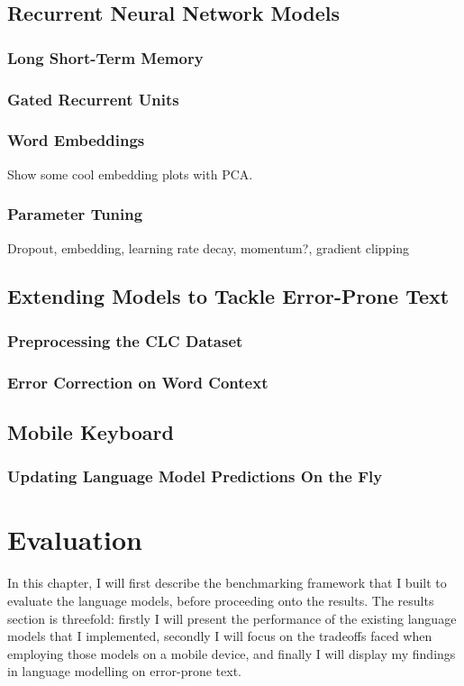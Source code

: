 \documentclass[a4paper, 12pt]{report}
\begin{document}
\section{Recurrent Neural Network Models}
\subsection{Long Short-Term Memory}
\subsection{Gated Recurrent Units}
\subsection{Word Embeddings}
Show some cool embedding plots with PCA.
\subsection{Parameter Tuning}
Dropout, embedding, learning rate decay, momentum?, gradient clipping
\section{Extending Models to Tackle Error-Prone Text}
\subsection{Preprocessing the CLC Dataset}
\subsection{Error Correction on Word Context}
\section{Mobile Keyboard}
\subsection{Updating Language Model Predictions On the Fly}

\chapter{Evaluation}

In this chapter, I will first describe the benchmarking framework that I built to evaluate the language models, before proceeding onto the results. The results section is threefold: firstly I will present the performance of the existing language models that I implemented, secondly I will focus on the tradeoffs faced when employing those models on a mobile device, and finally I will display my findings in language modelling on error-prone text.
\end{document}
